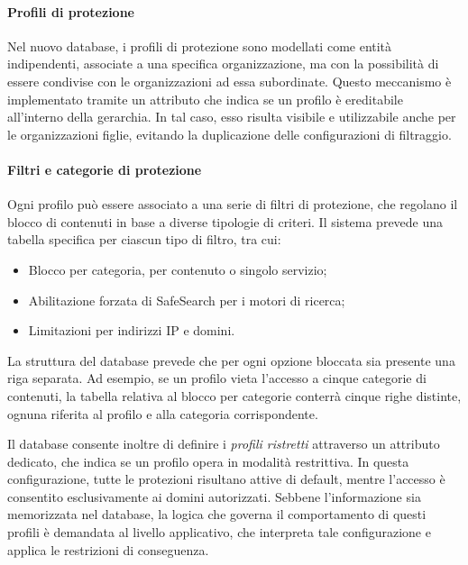 \paragraph{Profili di protezione}
Nel nuovo database, i profili di protezione sono modellati come entità indipendenti, associate a una specifica organizzazione, ma con la possibilità di essere condivise con le organizzazioni ad essa subordinate. Questo meccanismo è implementato tramite un attributo che indica se un profilo è ereditabile all'interno della gerarchia. In tal caso, esso risulta visibile e utilizzabile anche per le organizzazioni figlie, evitando la duplicazione delle configurazioni di filtraggio.

\paragraph{Filtri e categorie di protezione}
Ogni profilo può essere associato a una serie di filtri di protezione, che regolano il blocco di contenuti in base a diverse tipologie di criteri. Il sistema prevede una tabella specifica per ciascun tipo di filtro, tra cui:
\begin{itemize}
  \item Blocco per categoria, per contenuto o singolo servizio;
  \item Abilitazione forzata di SafeSearch per i motori di ricerca;
  \item Limitazioni per indirizzi IP e domini.
\end{itemize}
La struttura del database prevede che per ogni opzione bloccata sia presente una riga separata. Ad esempio, se un profilo vieta l’accesso a cinque categorie di contenuti, la tabella relativa al blocco per categorie conterrà cinque righe distinte, ognuna riferita al profilo e alla categoria corrispondente.

Il database consente inoltre di definire i \emph{profili ristretti} attraverso un attributo dedicato, che indica se un profilo opera in modalità restrittiva. In questa configurazione, tutte le protezioni risultano attive di default, mentre l’accesso è consentito esclusivamente ai domini autorizzati. Sebbene l’informazione sia memorizzata nel database, la logica che governa il comportamento di questi profili è demandata al livello applicativo, che interpreta tale configurazione e applica le restrizioni di conseguenza.


